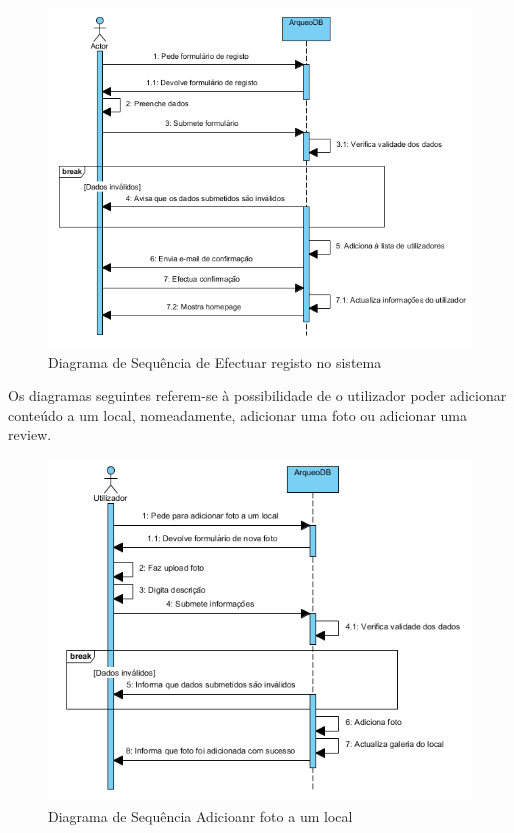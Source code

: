 ﻿\documentclass[12pt,a4paper]{article}
\begin{document}
\begin{figure}[h!]
\centering
\includegraphics[scale=1]{sequencia/registo}
\caption{Diagrama de Sequência de Efectuar registo no sistema} 
\end{figure}


\clearpage
Os diagramas seguintes referem-se à possibilidade de o utilizador poder adicionar conteúdo a um local, nomeadamente, adicionar uma foto ou adicionar uma review.\\

\begin{figure}[h!]
\centering
\includegraphics[scale=1]{sequencia/adicionarfoto}
\caption{Diagrama de Sequência Adicioanr foto a um local} 
\end{figure}
\end{document}

